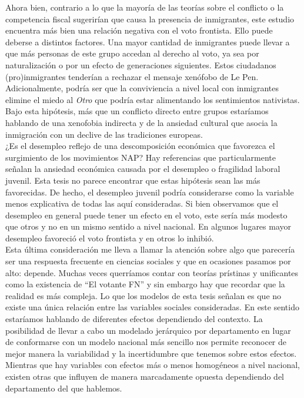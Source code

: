 Ahora bien, contrario a lo que la mayoría de las teorías sobre el conflicto o la competencia fiscal sugerirían que causa la presencia de inmigrantes, este estudio encuentra más bien una relación negativa con el voto frontista. Ello puede deberse a distintos factores. Una mayor cantidad de inmigrantes puede llevar a que más personas de este grupo accedan al derecho al voto, ya sea por naturalización o por un efecto de generaciones siguientes. Estos ciudadanos (pro)inmigrantes tenderían a rechazar el mensaje xenófobo de Le Pen. Adicionalmente, podría ser que la conviviencia a nivel local con inmigrantes elimine el miedo al \textit{Otro} que podría estar alimentando los sentimientos nativistas. Bajo esta hipótesis, más que un conflicto directo entre grupos estaríamos hablando de una xenofobia indirecta y de la ansiedad cultural que asocia la inmigración con un declive de las tradiciones europeas.\\

¿Es el desempleo reflejo de una descomposición económica que favorezca el surgimiento de los movimientos NAP? Hay referencias que particularmente señalan la ansiedad económica causada por el desempleo o fragilidad laboral juvenil. Esta tesis no parece encontrar que estas hipótesis sean las más favorecidas. De hecho, el desempleo juvenil podría considerarse como la variable menos explicativa de todas las aquí consideradas. Si bien observamos que el desempleo en general puede tener un efecto en el voto, este sería más modesto que otros y no en un mismo sentido a nivel nacional. En algunos lugares mayor desempleo favoreció el voto frontista y en otros lo inhibió.\\

Esta última consideración me lleva a llamar la atención sobre algo que parecería ser una respuesta frecuente en ciencias sociales y que en ocasiones pasamos por alto: depende. Muchas veces querríamos contar con teorías prístinas y unificantes como la existencia de ``El votante FN'' y sin embargo hay que recordar que la realidad es más compleja. Lo que los modelos de esta tesis señalan es que no existe una única relación entre las variables sociales consideradas. En este sentido estaríamos hablando de diferentes efectos dependiendo del contexto. La posibilidad de llevar a cabo un modelado jerárquico por departamento en lugar de conformarse con un modelo nacional más sencillo nos permite reconocer de mejor manera la variabilidad y la incertidumbre que tenemos sobre estos efectos. Mientras que hay variables con efectos más o menos homogéneos a nivel nacional, existen otras que influyen de manera marcadamente opuesta dependiendo del departamento del que hablemos.

